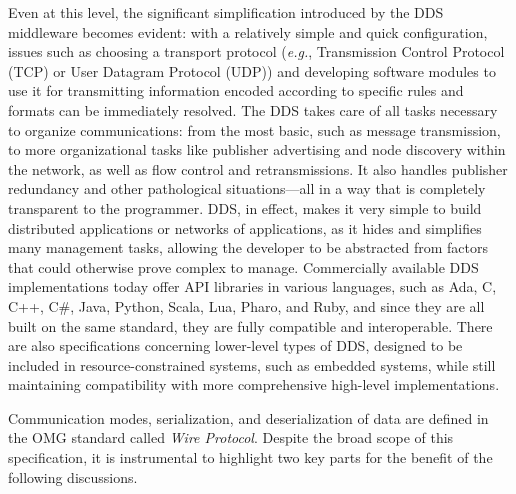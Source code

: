 Even at this level, the significant simplification introduced by the DDS middleware becomes evident: with a relatively simple and quick configuration, issues such as choosing a transport protocol (\emph{e.g.}, Transmission Control Protocol (TCP) or User Datagram Protocol (UDP)) and developing software modules to use it for transmitting information encoded according to specific rules and formats can be immediately resolved. The DDS takes care of all tasks necessary to organize communications: from the most basic, such as message transmission, to more organizational tasks like publisher advertising and node discovery within the network, as well as flow control and retransmissions. It also handles publisher redundancy and other pathological situations—all in a way that is completely transparent to the programmer. DDS, in effect, makes it very simple to build distributed applications or networks of applications, as it hides and simplifies many management tasks, allowing the developer to be abstracted from factors that could otherwise prove complex to manage. Commercially available DDS implementations today offer API libraries in various languages, such as Ada, C, C++, C\#, Java, Python, Scala, Lua, Pharo, and Ruby, and since they are all built on the same standard, they are fully compatible and interoperable. There are also specifications concerning lower-level types of DDS, designed to be included in resource-constrained systems, such as embedded systems, while still maintaining compatibility with more comprehensive high-level implementations.

Communication modes, serialization, and deserialization of data are defined in the OMG standard called \emph{Wire Protocol}. Despite the broad scope of this specification, it is instrumental to highlight two key parts for the benefit of the following discussions.


